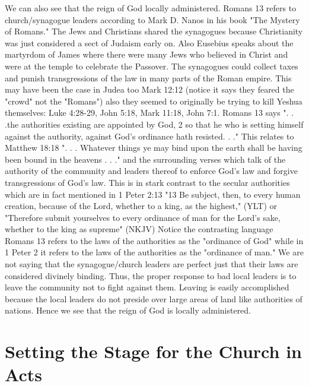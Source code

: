 \documentclass[11pt]{article}
\begin{document}
We can also see that the reign of God locally administered. Romans 13 refers to church/synagogue leaders according to Mark D. Nanos in his book "The Mystery of Romans." The Jews and Christians shared the synagogues because Christianity was just considered a sect of Judaism early on. Also Eusebius speaks about the martyrdom of James where there were many Jews who believed in Christ and were at the temple to celebrate the Passover. \cite{martyrdom of james} The synagogues could collect taxes and punish transgressions of the law in many parts of the Roman empire.%
This may have been the case in Judea too Mark 12:12 (notice it says they feared the "crowd" not the "Romans") also they seemed to originally be trying to kill Yeshua themselves: Luke 4:28-29, John 5:18, Mark 11:18, John 7:1. Romans 13 says ". . .the authorities existing are appointed by God, 2 so that he who is setting himself against the authority, against God's ordinance hath resisted. . ." This relates to Matthew 18:18 ". . . Whatever things ye may bind upon the earth shall be having been bound in the heavens . . ." and the surrounding verses which talk of the authority of the community and leaders thereof to enforce God's law and forgive transgressions of God's law. This is in stark contrast to the secular authorities which are in fact mentioned in 1 Peter 2:13 "13 Be subject, then, to every human creation, because of the Lord, whether to a king, as the highest," (YLT) or "Therefore submit yourselves to every ordinance of man for the Lord’s sake, whether to the king as supreme" (NKJV) Notice the contrasting language Romans 13 refers to the laws of the authorities as the "ordinance of God" while in 1 Peter 2 it refers to the laws of the authorities as the "ordinance of man." We are not saying that the synagogue/church leaders are perfect just that their laws are considered divinely binding. Thus, the proper response to bad local leaders is to leave the community not to fight against them. Leaving is easily accomplished because the local leaders do not preside over large areas of land like authorities of nations. Hence we see that the reign of God is locally administered.


\section{Setting the Stage for the Church in Acts}
\end{document}
